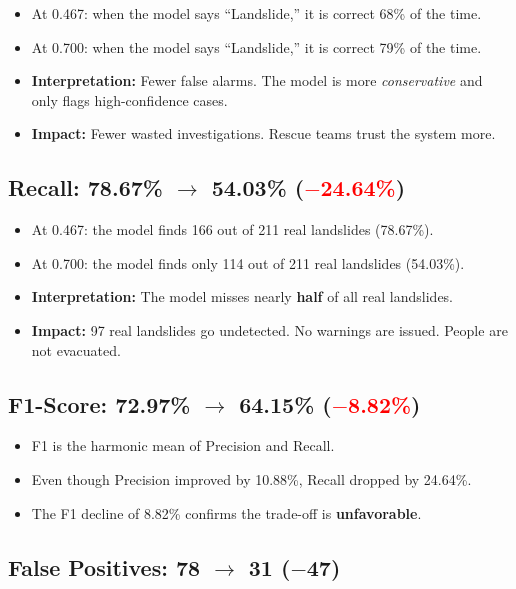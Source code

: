 \documentclass[11pt]{article}
\begin{document}
\begin{itemize}[noitemsep]
    \item At 0.467: when the model says ``Landslide,'' it is correct 68\% of the time.
    \item At 0.700: when the model says ``Landslide,'' it is correct 79\% of the time.
    \item \textbf{Interpretation:} Fewer false alarms. The model is more \textit{conservative} and only flags high-confidence cases.
    \item \textbf{Impact:} Fewer wasted investigations. Rescue teams trust the system more.
\end{itemize}

\subsection{Recall: 78.67\% $\to$ 54.03\% (\textcolor{red}{$-$24.64\%})}

\begin{itemize}[noitemsep]
    \item At 0.467: the model finds 166 out of 211 real landslides (78.67\%).
    \item At 0.700: the model finds only 114 out of 211 real landslides (54.03\%).
    \item \textbf{Interpretation:} The model misses nearly \textbf{half} of all real landslides.
    \item \textbf{Impact:} 97 real landslides go undetected. No warnings are issued. People are not evacuated.
\end{itemize}

\subsection{F1-Score: 72.97\% $\to$ 64.15\% (\textcolor{red}{$-$8.82\%})}

\begin{itemize}[noitemsep]
    \item F1 is the harmonic mean of Precision and Recall.
    \item Even though Precision improved by 10.88\%, Recall dropped by 24.64\%.
    \item The F1 decline of 8.82\% confirms the trade-off is \textbf{unfavorable}.
\end{itemize}

\subsection{False Positives: 78 $\to$ 31 (\textcolor{green!60!black}{$-$47})}
\end{document}
